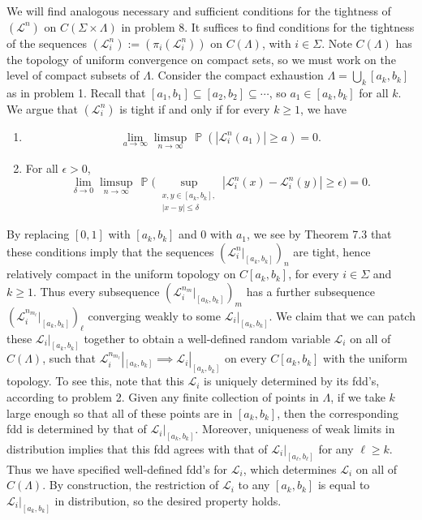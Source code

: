 \documentclass[12pt]{article}
\DeclareMathOperator{\pr}{\mathbb{P}}
\begin{document}
		We will find analogous necessary and sufficient conditions for the tightness of $(\mathcal{L}^n)$ on $C(\Sigma\times\Lambda)$ in problem 8. It suffices to find conditions for the tightness of the sequences $(\mathcal{L}^n_i) := (\pi_i(\mathcal{L}^n_i))$ on $C(\Lambda)$, with $i\in\Sigma$. Note $C(\Lambda)$ has the topology of uniform convergence on compact sets, so we must work on the level of compact subsets of $\Lambda$. Consider the compact exhaustion $\Lambda = \bigcup_k [a_k,b_k]$ as in problem 1. Recall that $[a_1,b_1]\subseteq [a_2,b_2]\subseteq\cdots$, so $a_1\in [a_k,b_k]$ for all $k$. We argue that $(\mathcal{L}^n_i)$ is tight if and only if for every $k\geq 1$, we have
		\begin{enumerate}[label=(\roman*)]
			
			\item 
			\[
			\lim_{a\to\infty} \limsup_{n\to\infty}\, \pr(|\mathcal{L}^n_i(a_1)|\geq a) = 0.
			\]
			
			\item For all $\epsilon>0$,
			\[
			\lim_{\delta\to 0} \limsup_{n\to\infty}\, \pr\bigg(\sup_{\substack{x,y\in [a_k,b_k], \\ |x-y|\leq\delta}} |\mathcal{L}^n_i(x) - \mathcal{L}^n_i(y)| \geq \epsilon\bigg) = 0.
			\]
			
		\end{enumerate}
	
		By replacing $[0,1]$ with $[a_k,b_k]$ and 0 with $a_1$, we see by Theorem 7.3 that these conditions imply that the sequences $(\mathcal{L}^n_i|_{[a_k,b_k]})_n$ are tight, hence relatively compact in the uniform topology on $C[a_k,b_k]$, for every $i\in\Sigma$ and $k\geq 1$. Thus every subsequence $(\mathcal{L}^{n_m}_i|_{[a_k,b_k]})_m$ has a further subsequence $(\mathcal{L}^{n_{m_\ell}}_i|_{[a_k,b_k]})_\ell$ converging weakly to some $\mathcal{L}_i|_{[a_k,b_k]}$. We claim that we can patch these $\mathcal{L}_i|_{[a_k,b_k]}$ together to obtain a well-defined random variable $\mathcal{L}_i$ on all of $C(\Lambda)$, such that $\mathcal{L}_i^{n_{m_\ell}}|_{[a_k,b_k]} \implies \mathcal{L}_i|_{[a_k,b_k]}$ on every $C[a_k,b_k]$ with the uniform topology. To see this, note that this $\mathcal{L}_i$ is uniquely determined by its fdd's, according to problem 2. Given any finite collection of points in $\Lambda$, if we take $k$ large enough so that all of these points are in $[a_k,b_k]$, then the corresponding fdd is determined by that of $\mathcal{L}_i|_{[a_k,b_k]}$. Moreover, uniqueness of weak limits in distribution implies that this fdd agrees with that of $\mathcal{L}_i|_{[a_\ell,b_\ell]}$ for any $\ell\geq k$. Thus we have specified well-defined fdd's for $\mathcal{L}_i$, which determines $\mathcal{L}_i$ on all of $C(\Lambda)$. By construction, the restriction of $\mathcal{L}_i$ to any $[a_k,b_k]$ is equal to $\mathcal{L}_i|_{[a_k,b_k]}$ in distribution, so the desired property holds.
		
\end{document}
